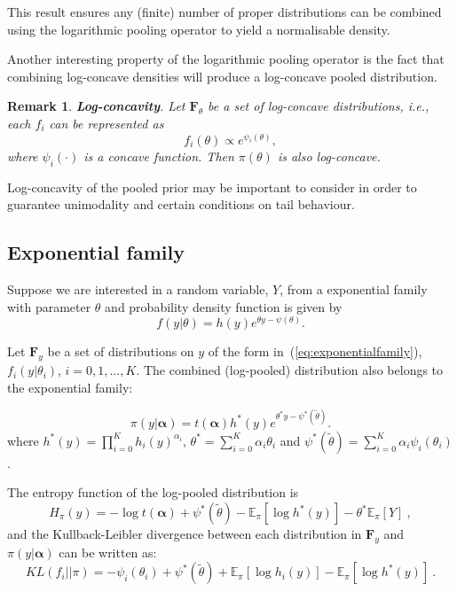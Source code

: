 \documentclass[a4paper, notitlepage, 10pt]{article}
\newtheorem{remark}{Remark}[]
\begin{document}
This result ensures any (finite) number of proper distributions can be combined using the logarithmic pooling operator to yield a normalisable density.

Another interesting property of the logarithmic pooling operator is the fact that combining log-concave densities will produce a log-concave pooled distribution.
\begin{remark}
\label{rmk:concavity}
\textbf{Log-concavity}. 
 Let $\mathbf{F}_{\theta}$ be a set of log-concave distributions, i.e., each $f_i$ can be represented as
 \begin{equation}
  \label{eq:logconcavity}
  f_i(\theta) \propto e^{\psi_i(\theta)},
 \end{equation}
where $\psi_i(\cdot)$ is a concave function.
Then $\pi(\theta)$ is also log-concave.
\end{remark}

Log-concavity of the pooled prior may be important to consider in order to guarantee unimodality and certain conditions on tail behaviour.

\subsection*{Exponential family}

Suppose we are interested in a random variable, $Y$, from a exponential family with parameter $\theta$ and probability density function is given by
\begin{equation}
\label{eq:exponentialfamily}
f(y|\theta) = h(y) e^{\theta y - \psi(\theta)}.
\end{equation}

Let $\mathbf{F}_{y}$ be a set of distributions on $y$ of the form in~(\ref{eq:exponentialfamily}), $f_i(y|\theta_i)$, $ i = 0, 1, \ldots, K$. 
The combined (log-pooled) distribution also belongs to the exponential family:

\begin{equation}
\label{eq:pooldistEF}
\pi(y|\boldsymbol\alpha) = t(\boldsymbol\alpha) h^\ast (y) e^{\theta^\ast y - \psi^\ast (\tilde{\theta})}.
\end{equation}
where $h^\ast (y) = \prod_{i = 0}^K h_i(y)^{\alpha_i}$,  $\theta^\ast = \sum_{i = 0}^K \alpha_i \theta_i$ and $\psi^\ast (\tilde{\theta}) = \sum_{i = 0}^K \alpha_i \psi_i(\theta_i)$.

The entropy function of the log-pooled distribution is
\begin{equation}
\label{eq:entropydistEF}
H_\pi(y) =  -\log t(\boldsymbol\alpha) + \psi^\ast (\tilde{\theta}) - \mathbb{E}_\pi[\log h^\ast (y)] - \theta^\ast\mathbb{E}_\pi[Y] \: ,
\end{equation}
and the Kullback-Leibler divergence between each distribution in $\mathbf{F}_{y}$ and $\pi(y|\boldsymbol\alpha)$ can be written as:
\begin{equation}
\label{eq:KLdistEF}
KL(f_i || \pi)  =  -\psi_i(\theta_i) +   \psi^\ast (\tilde{\theta}) +  \mathbb{E}_\pi[\log h_i(y)] - \mathbb{E}_\pi[\log h^\ast (y)] \: .
\end{equation}
\end{document}
